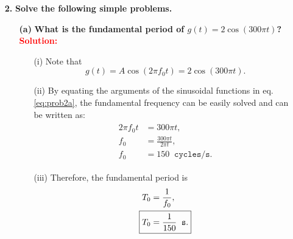\documentclass[a4paper, 12pt]{article}
\begin{document}
\begin{itemize}
\item[\textbf{2.}]{\textbf{Solve the following simple problems.}}
\begin{itemize}
\item[\textbf{(a)}]{\textbf{What is the fundamental period of $g(t) = 2 \cos \left( 300 \pi t \right)$?}}\\
\textbf{\textcolor{red}{\textbf{Solution:}}}
\begin{enumerate}
\item[(i)]{Note that}
\begin{equation}
g(t) = A \cos \left(2 \pi f_{0}t \right) = 2\cos \left(300 \pi t \right).
\label{eq:prob2a}
\end{equation}
\item[(ii)]{By equating the arguments of the sinusoidal functions in eq. \eqref{eq:prob2a}, the fundamental frequency can be easily solved and can be written as:}
\begin{equation}
\begin{gathered}
\begin{alignedat}{1}
2 \pi f_{0} t & = 300 \pi t, \\
f_{0} & = \frac{300 \pi t}{2 \pi t}, \\
f_{0} & = 150 \; \; \mathtt{cycles/s}.
\end{alignedat}
\end{gathered}
\end{equation}
\item[(iii)]{Therefore, the fundamental period is}
\begin{equation}
\begin{gathered}
\begin{alignedat}{1}
T_{0} &= \frac{1}{f_{0}}, \\
\Aboxed{T_{0} &= \frac{1}{150} \; \; \mathtt{s}.}
\end{alignedat}
\end{gathered}
\end{equation}
\end{enumerate}


\end{itemize}
\end{itemize}
\end{document}
